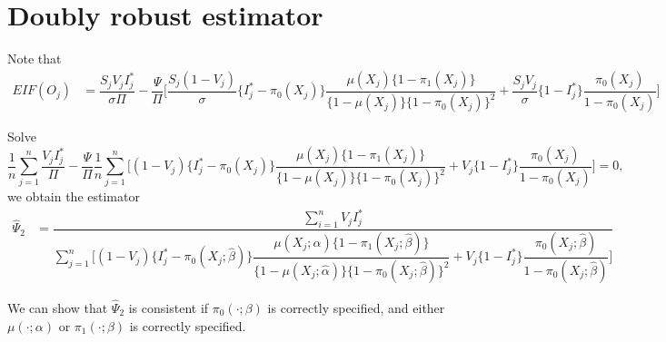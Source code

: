 \documentclass{article}
\begin{document}
\section{Doubly robust estimator}
Note that
\begin{align*}
    EIF(O_j) &=\dfrac{S_jV_j I^*_j}{\sigma \Pi} - \dfrac{\Psi}{\Pi}\bigg[ \dfrac{S_j(1 - V_j)}{\sigma}\{I^*_j - \pi_0(X_j)\}\dfrac{\mu(X_j)\{1 - \pi_1(X_j)\}}{\{1 - \mu(X_j)\}\{1 - \pi_0(X_j)\}^2} + \dfrac{S_jV_j}{\sigma}\{1-I^*_j\}\dfrac{\pi_0(X_j)}{1-\pi_0(X_j)}\bigg] 
\end{align*}

Solve
$$\dfrac{1}{n}\sum_{j=1}^n \dfrac{V_jI^*_j}{\Pi}-\dfrac{\Psi}{\Pi}\dfrac{1}{n}\sum_{j=1}^n\bigg[ (1-V_j)\{I^*_j - \pi_0(X_j)\}\dfrac{\mu(X_j)\{1 - \pi_1(X_j)\}}{\{1 - \mu(X_j)\}\{1 - \pi_0(X_j)\}^2} + V_j\{1-I^*_j\}\dfrac{\pi_0(X_j)}{1-\pi_0(X_j)}\bigg]=0,$$
we obtain the estimator 
\begin{align*}
\hat\Psi_2&= \dfrac{\sum_{i=1}^n V_jI_j^*}{\sum_{j=1}^n\bigg[ (1-V_j)\{I^*_j - \pi_0(X_j;\hat\beta)\}\dfrac{\mu(X_j;\hat\alpha)\{1 - \pi_1(X_j;\hat\beta)\}}{\{1 - \mu(X_j;\hat\alpha)\}\{1 - \pi_0(X_j;\hat\beta)\}^2} + V_j\{1-I^*_j\}\dfrac{\pi_0(X_j;\hat\beta)}{1-\pi_0(X_j;\hat\beta)}\bigg]}
\end{align*}

We can show that $\hat\Psi_2$ is consistent if $\pi_0(\cdot;\beta)$ is correctly specified, and either $\mu(\cdot;\alpha)$ or $\pi_1(\cdot;\beta)$ is correctly specified. 
\end{document}
